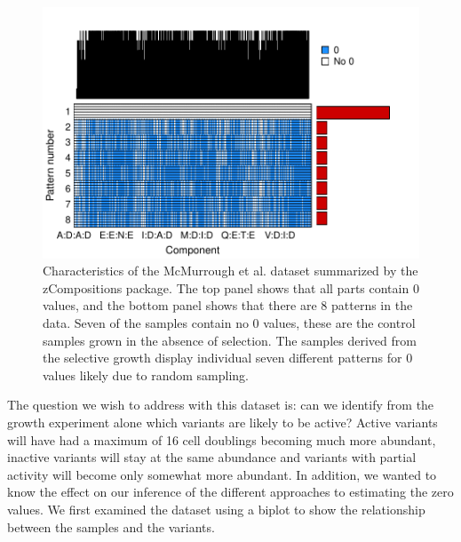 \documentclass[article]{ajs}\usepackage[]{graphicx}\usepackage[]{color}
\makeatletter
\def\maxwidth{ %
  \ifdim\Gin@nat@width>\linewidth
    \linewidth
  \else
    \Gin@nat@width
  \fi
}
\newenvironment{knitrout}{}{} %
\makeatother
\begin{document}
\begin{figure}[!ht]
\begin{center}
\begin{knitrout}
\color{fgcolor}
\includegraphics[width=\maxwidth]{figure/unnamed-chunk-2-1} 

\end{knitrout}
\caption{Characteristics of the McMurrough et al. \citeyear{mcmurrough:2014} dataset summarized by the zCompositions package. The top panel shows that all parts contain 0 values, and the bottom panel shows that there are 8 patterns in the data. Seven of the samples contain no 0 values, these are the control samples grown in the absence of selection. The samples derived from the selective growth display individual seven different patterns for 0 values likely due to random sampling.}
\label{fig:zPatterns}
\end{center}
\end{figure}

The question we wish to address with this dataset is: can we identify from the growth experiment alone which variants are likely to be active? Active variants will have had a maximum of 16 cell doublings becoming much more abundant, inactive variants will stay at the same abundance and variants with partial activity will become only somewhat more abundant. In addition, we wanted to know the effect on our inference of the different approaches to estimating the zero values. We  first examined the dataset using a biplot to show the relationship between the samples and the variants. 
\end{document}
